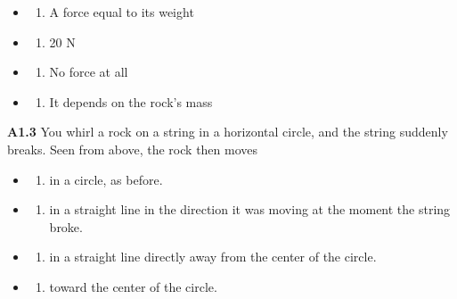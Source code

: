\documentclass[
]{article}
\providecommand{\tightlist}{%
  \setlength{\itemsep}{0pt}\setlength{\parskip}{0pt}}
\begin{document}
\begin{itemize}
\tightlist
\item
  \begin{enumerate}
  \def\labelenumi{\Alph{enumi})}
  \tightlist
  \item
    A force equal to its weight
  \end{enumerate}
\item
  \begin{enumerate}
  \def\labelenumi{\Alph{enumi})}
  \setcounter{enumi}{1}
  \tightlist
  \item
    20 N
  \end{enumerate}
\item
  \begin{enumerate}
  \def\labelenumi{\Alph{enumi})}
  \setcounter{enumi}{2}
  \tightlist
  \item
    No force at all
  \end{enumerate}
\item
  \begin{enumerate}
  \def\labelenumi{\Alph{enumi})}
  \setcounter{enumi}{3}
  \tightlist
  \item
    It depends on the rock's mass
  \end{enumerate}
\end{itemize}

\textbf{A1.3} You whirl a rock on a string in a horizontal circle, and
the string suddenly breaks. Seen from above, the rock then moves

\begin{itemize}
\tightlist
\item
  \begin{enumerate}
  \def\labelenumi{\Alph{enumi})}
  \tightlist
  \item
    in a circle, as before.
  \end{enumerate}
\item
  \begin{enumerate}
  \def\labelenumi{\Alph{enumi})}
  \setcounter{enumi}{1}
  \tightlist
  \item
    in a straight line in the direction it was moving at the moment the
    string broke.
  \end{enumerate}
\item
  \begin{enumerate}
  \def\labelenumi{\Alph{enumi})}
  \setcounter{enumi}{2}
  \tightlist
  \item
    in a straight line directly away from the center of the circle.
  \end{enumerate}
\item
  \begin{enumerate}
  \def\labelenumi{\Alph{enumi})}
  \setcounter{enumi}{3}
  \tightlist
  \item
    toward the center of the circle.
  \end{enumerate}
\end{itemize}
\end{document}
